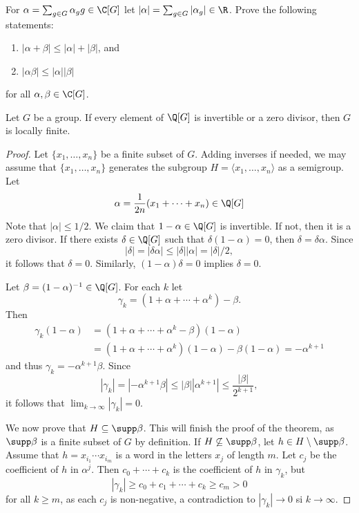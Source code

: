 \begin{exercise}
	\label{exa:norma}
	For $\alpha=\sum_{g\in G}\alpha_gg\in\C[G]$ let $|\alpha|=\sum_{g\in
	G}|\alpha_g|\in\R$. Prove the following statements:
	\begin{enumerate}
		\item $|\alpha+\beta|\leq|\alpha|+|\beta|$, and 
		\item $|\alpha\beta|\leq|\alpha||\beta|$ 
	\end{enumerate}
	for all $\alpha,\beta\in\C[G]$.
\end{exercise}

\begin{theorem}[Formanek]
	\label{thm:FormanekQ}
	Let $G$ be a group. If every element of $\Q[G]$ is invertible or 
	a zero divisor, then $G$ is locally finite. 
\end{theorem}

\begin{proof}
	Let $\{x_1,\dots,x_n\}$ be a finite subset of $G$. Adding inverses if needed, we may assume that 
	$\{x_1,\dots,x_n\}$ generates the subgroup
	$H=\langle x_1,\dots,x_n\rangle$ as a semigroup. Let 
	\[
		\alpha=\frac{1}{2n}(x_1+\cdots+x_n)\in\Q[G]
	\]
    Note that $|\alpha|\leq 1/2$. 
	We claim that $1-\alpha\in\Q[G]$ is invertible. If not, then it is a zero divisor. If there exists 
	$\delta\in\Q[G]$ such that $\delta(1-\alpha)=0$, then 
	$\delta=\delta\alpha$. Since  
	\[
		|\delta|=|\delta\alpha|\leq|\delta||\alpha|=|\delta|/2,
	\]
	it follows that $\delta=0$. Similarly, $(1-\alpha)\delta=0$ implies
	$\delta=0$. 
	
	Let $\beta=(1-\alpha)^{-1}\in\Q[G]$.  For each $k$ let  
	\[
		\gamma_k=(1+\alpha+\cdots+\alpha^k)-\beta.
	\]
	Then 
	\begin{align*}
		\gamma_k(1-\alpha)&=(1+\alpha+\cdots+\alpha^k-\beta)(1-\alpha)\\
		&=(1+\alpha+\cdots+\alpha^k)(1-\alpha)-\beta(1-\alpha)=-\alpha^{k+1}
	\end{align*}
	and thus  
	$\gamma_k=-\alpha^{k+1}\beta$. Since  
	\[
		|\gamma_k|=|-\alpha^{k+1}\beta|\leq|\beta||\alpha^{k+1}|\leq\frac{|\beta|}{2^{k+1}},
	\]
	it follows that $\lim_{k\to\infty}|\gamma_k|=0$. 

	We now prove that $H\subseteq\supp\beta$. This will finish the proof of the theorem, 
	as $\supp\beta$ is a finite subset of $G$ by definition. If
	$H\not\subseteq\supp\beta$, let $h\in H\setminus\supp\beta$.  Assume that 
    $h=x_{i_1}\cdots x_{i_m}$ is a word in the letters $x_j$ of length $m$. Let 
    $c_j$ be the coefficient of $h$ in $\alpha^j$. Then $c_0+\cdots+c_k$ is the 
	coefficient of $h$ in $\gamma_k$, but 
	\[
		|\gamma_k|\geq c_0+c_1+\cdots+c_k\geq c_m>0
	\]
	for all $k\geq m$, as each $c_j$ is non-negative, a contradiction to 
	$|\gamma_k|\to 0$ si $k\to\infty$.
\end{proof}

